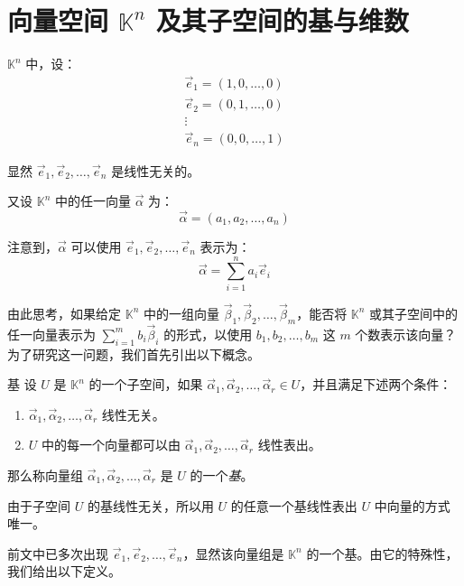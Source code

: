 
\section{向量空间 $\mathbb K^n$ 及其子空间的基与维数}

$\mathbb K^n$ 中，设：
$$
\begin{gathered}
	\vec e_1 = (1, 0, \ldots, 0)
	\\
	\vec e_2 = (0, 1, \ldots, 0)
	\\
	\vdots
	\\
	\vec e_n = (0, 0, \ldots, 1)
\end{gathered}
$$

显然 $\vec e_1, \vec e_2, \ldots, \vec e_n$ 是线性无关的。

又设 $\mathbb K^n$ 中的任一向量 $\vec \alpha$ 为：
$$
\vec \alpha = (a_1, a_2, \ldots, a_n)
$$

注意到，$\vec \alpha$ 可以使用 $\vec e_1, \vec e_2, \ldots, \vec e_n$ 表示为：
$$
\vec \alpha = \sum\limits_{i = 1}^n a_i \vec e_i
$$

由此思考，如果给定 $\mathbb K^n$ 中的一组向量 $\vec \beta_1, \vec \beta_2, \ldots, \vec \beta_m$，能否将 $\mathbb K^n$ 或其子空间中的任一向量表示为 $\sum\limits_{i = 1}^m b_i \vec \beta_i$ 的形式，以使用 $b_1, b_2, \ldots, b_m$ 这 $m$ 个数表示该向量？为了研究这一问题，我们首先引出以下概念。

\begin{definition}{基}
	设 $U$ 是 $\mathbb K^n$ 的一个子空间，如果 $\vec \alpha_1, \vec \alpha_2, \ldots, \vec \alpha_r \in U$，并且满足下述两个条件：
	\begin{enumerate}
		\item $\vec \alpha_1, \vec \alpha_2, \ldots, \vec \alpha_r$ 线性无关。
		\item $U$ 中的每一个向量都可以由 $\vec \alpha_1, \vec \alpha_2, \ldots, \vec \alpha_r$ 线性表出。
	\end{enumerate}

	那么称向量组 $\vec \alpha_1, \vec \alpha_2, \ldots, \vec \alpha_r$ 是 $U$ 的一个\emph{基}。
\end{definition}

由于子空间 $U$ 的基线性无关，所以用 $U$ 的任意一个基线性表出 $U$ 中向量的方式唯一。

前文中已多次出现 $\vec e_1, \vec e_2, \ldots, \vec e_n$，显然该向量组是 $\mathbb K^n$ 的一个基。由它的特殊性，我们给出以下定义。

